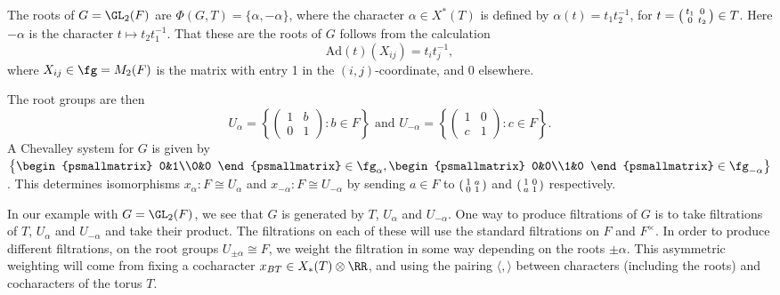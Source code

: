 \begin{example}
    The roots of $G=\GL_2(F)$ are $\Phi(G,T) = \{\alpha,-\alpha\}$, where the character $\alpha \in X^*(T)$ is defined by $\alpha(t) = t_1t_2^{-1}$, for $t=\begin{psmallmatrix}
        t_1 & 0 \\0&t_2
    \end{psmallmatrix} \in T$. Here $-\alpha$ is the character $t \mapsto t_2t_1^{-1}$. That these are the roots of $G$ follows from the calculation 
    $$\mathrm{Ad}(t)(X_{ij}) = t_it_j^{-1},$$
    where $X_{ij} \in \fg = M_2(F)$ is the matrix with entry 1 in the $(i,j)$-coordinate, and 0 elsewhere.

    The root groups are then 
    $$U_\alpha = \left\{\begin{pmatrix}
        1&b\\0&1
    \end{pmatrix} : b \in F\right\} \text{ and } U_{-\alpha} = \left\{\begin{pmatrix}
        1&0\\c&1
    \end{pmatrix} : c \in F\right\}.$$
    A Chevalley system for $G$ is given by $\left\{\begin{psmallmatrix}
        0&1\\0&0
    \end{psmallmatrix} \in \fg_\alpha, \begin{psmallmatrix}
        0&0\\1&0
    \end{psmallmatrix} \in \fg_{-\alpha}\right\}$. This determines isomorphisms $x_\alpha: F \cong U_\alpha$ and $x_{-\alpha}: F \cong U_{-\alpha}$ by sending $a \in F$ to $\begin{psmallmatrix}
        1&a\\0&1
    \end{psmallmatrix}$ and $\begin{psmallmatrix}
        1&0\\a&1
    \end{psmallmatrix}$ respectively.
\end{example}

In our example with $G=\GL_2(F)$, we see that $G$ is generated by $T$, $U_\alpha$ and $U_{-\alpha}$. One way to produce filtrations of $G$ is to take filtrations of $T$, $U_{\alpha}$ and $U_{-\alpha}$ and take their product. The filtrations on each of these will use the standard filtrations on $F$ and $F^\times$. In order to produce different filtrations, on the root groups $U_{\pm \alpha} \cong F$, we weight the filtration in some way depending on the roots $\pm \alpha$. This asymmetric weighting will come from fixing a cocharacter $x_{BT} \in X_*(T) \otimes \RR$, and using the pairing $\langle, \rangle$ between characters (including the roots) and cocharacters of the torus $T$.

